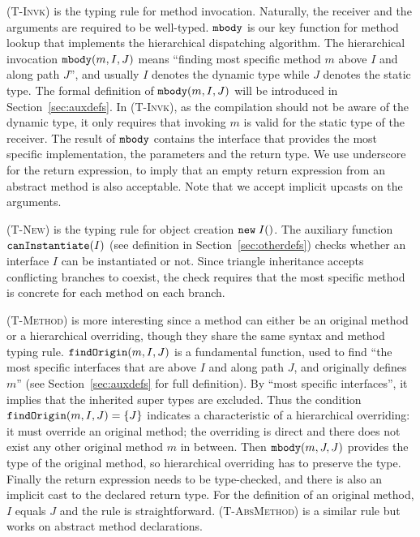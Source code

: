 \textsc{(T-Invk)} is the typing rule for method invocation.
Naturally, the receiver and the arguments are required to be well-typed.
$\texttt{mbody}$ is our key function for method lookup that implements the
hierarchical dispatching algorithm. 
The hierarchical invocation $\texttt{mbody}(m, I, J)$ means ``finding most specific method $m$
above $I$ and along path $J$'', and usually $I$ denotes the dynamic type while $J$
denotes the static type. 
The formal definition of $\texttt{mbody}(m, I, J)$ will be introduced in
Section~\ref{sec:auxdefs}.
In \textsc{(T-Invk)}, as the compilation should not be aware
of the dynamic type, it only requires that invoking $m$ is valid for the static type of the
receiver. The result of $\texttt{mbody}$ contains the interface that provides the most specific implementation,
the parameters and the return type. We use underscore for the return expression, to imply that an empty return expression
from an abstract method is also acceptable.
Note that we accept implicit upcasts on the arguments.

\textsc{(T-New)} is the typing rule for object creation $\texttt{new} \; I()$. The
auxiliary function $\texttt{canInstantiate}(I)$ (see definition in Section~\ref{sec:otherdefs}) checks whether an interface $I$ 
can be instantiated or not. Since triangle inheritance accepts conflicting branches to coexist, the check requires that the most specific method is concrete for each method on each branch.

\textsc{(T-Method)} is more interesting since a method can either be an original method or a hierarchical overriding, though
they share the same syntax and method typing rule. $\texttt{findOrigin}(m, I, J)$ is a fundamental function,
used to find ``the most specific interfaces that are above $I$ and
along path $J$, and originally defines $m$'' (see
Section~\ref{sec:auxdefs} for full definition).
By ``most specific interfaces'',
it implies that the inherited super types are excluded. Thus the condition $\texttt{findOrigin}(m, I, J) = \{J\}$ indicates a characteristic of a hierarchical overriding: it must override an original method; the overriding is direct and there does not exist any other original method $m$ in between.
Then $\texttt{mbody}(m, J, J)$ provides the type of the original method, so hierarchical overriding has to preserve the type. Finally the return expression
needs to be type-checked, and there is also an implicit cast to the declared return type. For the definition of an original method, $I$ equals $J$ and the rule is straightforward. \textsc{(T-AbsMethod)} is a similar rule but works on abstract method declarations.

